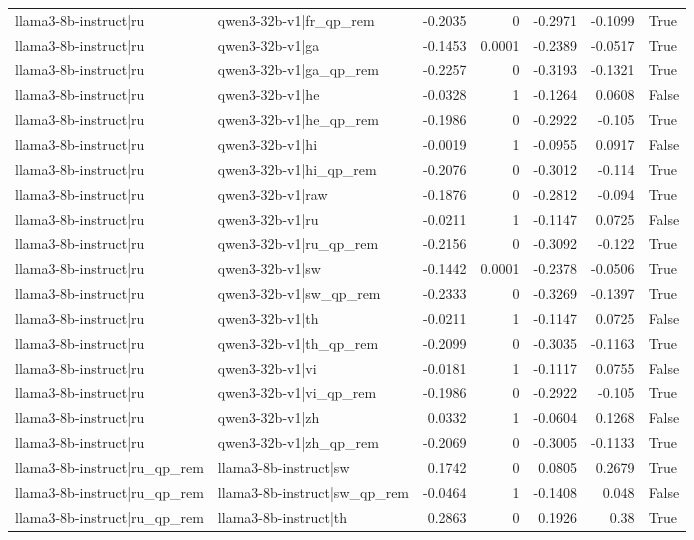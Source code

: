 \begin{table}
\begin{tabular}{l l r r r r l}
llama3-8b-instruct|ru & qwen3-32b-v1|fr_qp_rem & -0.2035 & 0 & -0.2971 & -0.1099 & True \\
llama3-8b-instruct|ru & qwen3-32b-v1|ga & -0.1453 & 0.0001 & -0.2389 & -0.0517 & True \\
llama3-8b-instruct|ru & qwen3-32b-v1|ga_qp_rem & -0.2257 & 0 & -0.3193 & -0.1321 & True \\
llama3-8b-instruct|ru & qwen3-32b-v1|he & -0.0328 & 1 & -0.1264 & 0.0608 & False \\
llama3-8b-instruct|ru & qwen3-32b-v1|he_qp_rem & -0.1986 & 0 & -0.2922 & -0.105 & True \\
llama3-8b-instruct|ru & qwen3-32b-v1|hi & -0.0019 & 1 & -0.0955 & 0.0917 & False \\
llama3-8b-instruct|ru & qwen3-32b-v1|hi_qp_rem & -0.2076 & 0 & -0.3012 & -0.114 & True \\
llama3-8b-instruct|ru & qwen3-32b-v1|raw & -0.1876 & 0 & -0.2812 & -0.094 & True \\
llama3-8b-instruct|ru & qwen3-32b-v1|ru & -0.0211 & 1 & -0.1147 & 0.0725 & False \\
llama3-8b-instruct|ru & qwen3-32b-v1|ru_qp_rem & -0.2156 & 0 & -0.3092 & -0.122 & True \\
llama3-8b-instruct|ru & qwen3-32b-v1|sw & -0.1442 & 0.0001 & -0.2378 & -0.0506 & True \\
llama3-8b-instruct|ru & qwen3-32b-v1|sw_qp_rem & -0.2333 & 0 & -0.3269 & -0.1397 & True \\
llama3-8b-instruct|ru & qwen3-32b-v1|th & -0.0211 & 1 & -0.1147 & 0.0725 & False \\
llama3-8b-instruct|ru & qwen3-32b-v1|th_qp_rem & -0.2099 & 0 & -0.3035 & -0.1163 & True \\
llama3-8b-instruct|ru & qwen3-32b-v1|vi & -0.0181 & 1 & -0.1117 & 0.0755 & False \\
llama3-8b-instruct|ru & qwen3-32b-v1|vi_qp_rem & -0.1986 & 0 & -0.2922 & -0.105 & True \\
llama3-8b-instruct|ru & qwen3-32b-v1|zh & 0.0332 & 1 & -0.0604 & 0.1268 & False \\
llama3-8b-instruct|ru & qwen3-32b-v1|zh_qp_rem & -0.2069 & 0 & -0.3005 & -0.1133 & True \\
llama3-8b-instruct|ru_qp_rem & llama3-8b-instruct|sw & 0.1742 & 0 & 0.0805 & 0.2679 & True \\
llama3-8b-instruct|ru_qp_rem & llama3-8b-instruct|sw_qp_rem & -0.0464 & 1 & -0.1408 & 0.048 & False \\
llama3-8b-instruct|ru_qp_rem & llama3-8b-instruct|th & 0.2863 & 0 & 0.1926 & 0.38 & True \\

\end{tabular}
\end{table}
